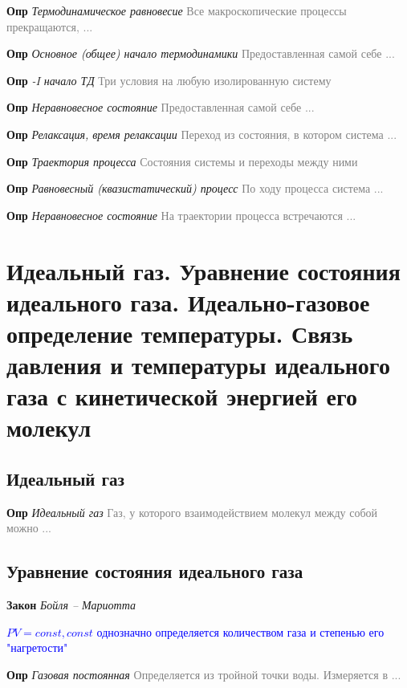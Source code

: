 \documentclass[a4paper, 14pt]{article}
\begin{document}
    \textbf{Опр} \textit{Термодинамическое равновесие} \textcolor{gray}{Все макроскопические процессы прекращаются, ...}

    \textbf{Опр} \textit{Основное (общее) начало термодинамики} \textcolor{gray}{Предоставленная самой себе ...}

    \textbf{Опр} \textit{-I начало ТД} \textcolor{gray}{Три условия на любую изолированную систему}

    \textbf{Опр} \textit{Неравновесное состояние} \textcolor{gray}{Предоставленная самой себе ...}

    \textbf{Опр} \textit{Релаксация, время релаксации} \textcolor{gray}{Переход из состояния, в котором система ...}

    \textbf{Опр} \textit{Траектория процесса} \textcolor{gray}{Состояния системы и переходы между ними}

    \textbf{Опр} \textit{Равновесный (квазистатический) процесс} \textcolor{gray}{По ходу процесса система ...}

    \textbf{Опр} \textit{Неравновесное состояние} \textcolor{gray}{На траектории процесса встречаются ...}

    \section{Идеальный газ.
    Уравнение состояния идеального газа.
    Идеально-газовое определение температуры.
    Связь давления и температуры идеального газа с кинетической энергией его молекул}

    \subsection{Идеальный газ}

    \textbf{Опр} \textit{Идеальный газ} \textcolor{gray}{Газ, у которого взаимодействием молекул между собой можно ...}

    \subsection{Уравнение состояния идеального газа}


    \textbf{Закон} \textit{Бойля -- Мариотта}

    \textcolor{blue}{$PV = const, const$ однозначно определяется количеством газа и степенью его "нагретости"}

    \textbf{Опр} \textit{Газовая постоянная} \textcolor{gray}{Определяется из тройной точки воды. Измеряется в ...}
\end{document}
